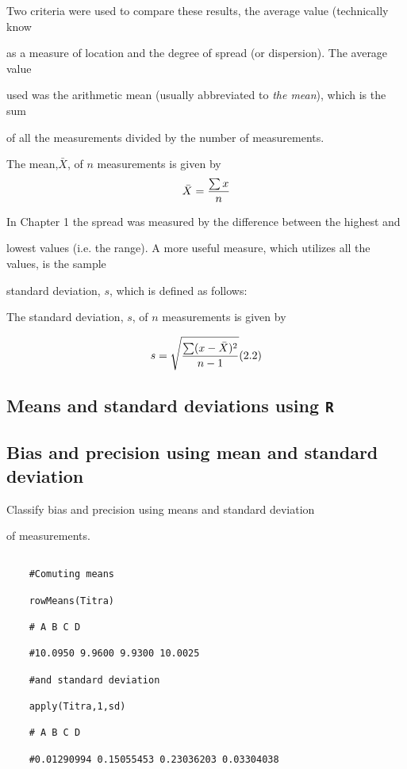\documentclass[12pt, a4paper]{article}
\begin{document}
Two criteria were used to compare these results, the average value (technically know

as a measure of location and the degree of spread (or dispersion). The average value

used was the arithmetic mean (usually abbreviated to \emph{the mean}), which is the sum

of all the measurements divided by the number of measurements.





The mean,$\bar{X}$, of $n$ measurements is given by \[ \bar{X}  = {\sum{x} \over n} \]



In Chapter 1 the spread was measured by the difference between the highest and

lowest values (i.e. the range). A more useful measure, which utilizes all the values, is the sample

standard deviation, $s$, which is defined as follows:



The standard deviation, $s$, of $n$ measurements is given by

\[s=  \sqrt{ {\sum(x-\bar{X})^2 \over n-1} }  (2.2) \]


\subsection{Means and standard deviations using \texttt{R}}

\subsection{Bias and precision using mean and standard deviation}



Classify bias and precision using means and standard deviation

of measurements.

\begin{framed}
	\begin{verbatim}
	
	#Comuting means
	
	rowMeans(Titra)
	
	# A B C D
	
	#10.0950 9.9600 9.9300 10.0025
	
	#and standard deviation
	
	apply(Titra,1,sd)
	
	# A B C D
	
	#0.01290994 0.15055453 0.23036203 0.03304038
	
	\end{verbatim}
\end{framed}
\newpage
\end{document}
